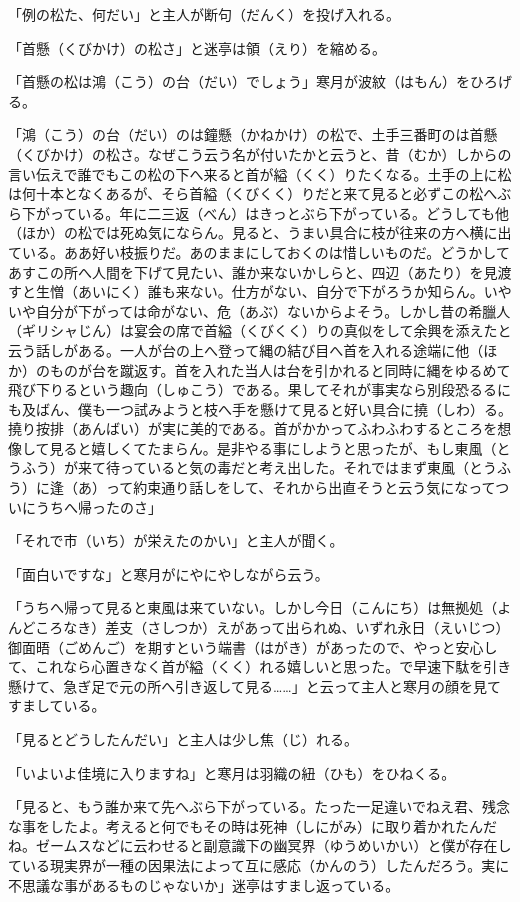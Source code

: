 \documentclass{book}
\begin{document}
「例の松た、何だい」と主人が断句（だんく）を投げ入れる。

「首懸（くびかけ）の松さ」と迷亭は領（えり）を縮める。

「首懸の松は鴻（こう）の台（だい）でしょう」寒月が波紋（はもん）をひろげる。

「鴻（こう）の台（だい）のは鐘懸（かねかけ）の松で、土手三番町のは首懸（くびかけ）の松さ。なぜこう云う名が付いたかと云うと、昔（むか）しからの言い伝えで誰でもこの松の下へ来ると首が縊（くく）りたくなる。土手の上に松は何十本となくあるが、そら首縊（くびくく）りだと来て見ると必ずこの松へぶら下がっている。年に二三返（べん）はきっとぶら下がっている。どうしても他（ほか）の松では死ぬ気にならん。見ると、うまい具合に枝が往来の方へ横に出ている。ああ好い枝振りだ。あのままにしておくのは惜しいものだ。どうかしてあすこの所へ人間を下げて見たい、誰か来ないかしらと、四辺（あたり）を見渡すと生憎（あいにく）誰も来ない。仕方がない、自分で下がろうか知らん。いやいや自分が下がっては命がない、危（あぶ）ないからよそう。しかし昔の希臘人（ギリシャじん）は宴会の席で首縊（くびくく）りの真似をして余興を添えたと云う話しがある。一人が台の上へ登って縄の結び目へ首を入れる途端に他（ほか）のものが台を蹴返す。首を入れた当人は台を引かれると同時に縄をゆるめて飛び下りるという趣向（しゅこう）である。果してそれが事実なら別段恐るるにも及ばん、僕も一つ試みようと枝へ手を懸けて見ると好い具合に撓（しわ）る。撓り按排（あんばい）が実に美的である。首がかかってふわふわするところを想像して見ると嬉しくてたまらん。是非やる事にしようと思ったが、もし東風（とうふう）が来て待っていると気の毒だと考え出した。それではまず東風（とうふう）に逢（あ）って約束通り話しをして、それから出直そうと云う気になってついにうちへ帰ったのさ」

「それで市（いち）が栄えたのかい」と主人が聞く。

「面白いですな」と寒月がにやにやしながら云う。

「うちへ帰って見ると東風は来ていない。しかし今日（こんにち）は無拠処（よんどころなき）差支（さしつか）えがあって出られぬ、いずれ永日（えいじつ）御面晤（ごめんご）を期すという端書（はがき）があったので、やっと安心して、これなら心置きなく首が縊（くく）れる嬉しいと思った。で早速下駄を引き懸けて、急ぎ足で元の所へ引き返して見る\ldots{}\ldots{}」と云って主人と寒月の顔を見てすましている。

「見るとどうしたんだい」と主人は少し焦（じ）れる。

「いよいよ佳境に入りますね」と寒月は羽織の紐（ひも）をひねくる。

「見ると、もう誰か来て先へぶら下がっている。たった一足違いでねえ君、残念な事をしたよ。考えると何でもその時は死神（しにがみ）に取り着かれたんだね。ゼームスなどに云わせると副意識下の幽冥界（ゆうめいかい）と僕が存在している現実界が一種の因果法によって互に感応（かんのう）したんだろう。実に不思議な事があるものじゃないか」迷亭はすまし返っている。
\end{document}
